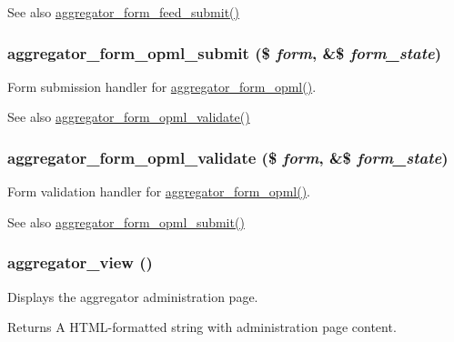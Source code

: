 \begin{DoxySeeAlso}{See also}
\hyperlink{aggregator_8admin_8inc_af98f428f07034e19622342875fe30984}{aggregator\_\-form\_\-feed\_\-submit()} 
\end{DoxySeeAlso}
\hypertarget{aggregator_8admin_8inc_a6ecc54a12406fb7c756c204966dd00cd}{
\subsubsection[{aggregator\_\-form\_\-opml\_\-submit}]{\setlength{\rightskip}{0pt plus 5cm}aggregator\_\-form\_\-opml\_\-submit (\$ {\em form}, \/  \&\$ {\em form\_\-state})}}
\label{aggregator_8admin_8inc_a6ecc54a12406fb7c756c204966dd00cd}
Form submission handler for \hyperlink{group__forms_gaf23a2363758db071378145309e4ee993}{aggregator\_\-form\_\-opml()}.

\begin{DoxySeeAlso}{See also}
\hyperlink{aggregator_8admin_8inc_a62f9c539278bc79a398c545ff7c7ec60}{aggregator\_\-form\_\-opml\_\-validate()} 
\end{DoxySeeAlso}
\hypertarget{aggregator_8admin_8inc_a62f9c539278bc79a398c545ff7c7ec60}{
\subsubsection[{aggregator\_\-form\_\-opml\_\-validate}]{\setlength{\rightskip}{0pt plus 5cm}aggregator\_\-form\_\-opml\_\-validate (\$ {\em form}, \/  \&\$ {\em form\_\-state})}}
\label{aggregator_8admin_8inc_a62f9c539278bc79a398c545ff7c7ec60}
Form validation handler for \hyperlink{group__forms_gaf23a2363758db071378145309e4ee993}{aggregator\_\-form\_\-opml()}.

\begin{DoxySeeAlso}{See also}
\hyperlink{aggregator_8admin_8inc_a6ecc54a12406fb7c756c204966dd00cd}{aggregator\_\-form\_\-opml\_\-submit()} 
\end{DoxySeeAlso}
\hypertarget{aggregator_8admin_8inc_adbb245c75bc2cb47e784fb454e134594}{
\subsubsection[{aggregator\_\-view}]{\setlength{\rightskip}{0pt plus 5cm}aggregator\_\-view ()}}
\label{aggregator_8admin_8inc_adbb245c75bc2cb47e784fb454e134594}
Displays the aggregator administration page.

\begin{DoxyReturn}{Returns}
A HTML-\/formatted string with administration page content. 
\end{DoxyReturn}
